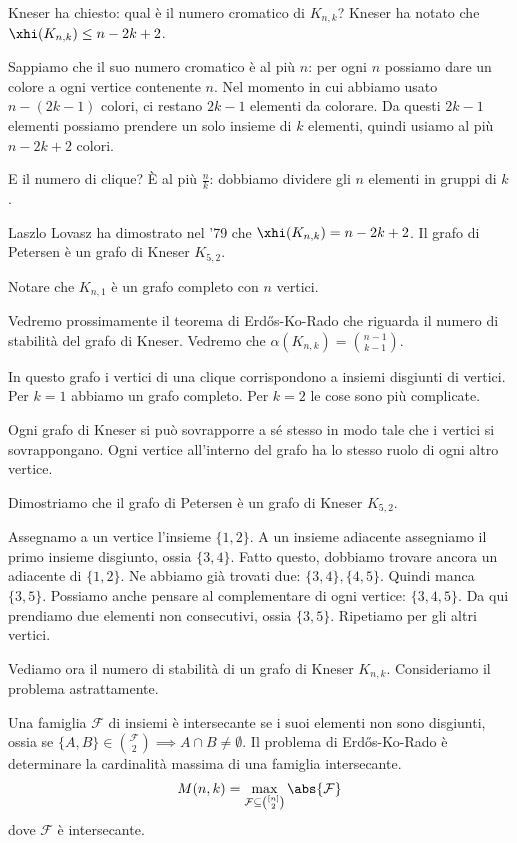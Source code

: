 Kneser ha chiesto: qual \`e il numero cromatico di $K_{n,k}$?
Kneser ha notato che $\xhi(K_{n,k}) \le n - 2k + 2$.

Sappiamo che il suo numero cromatico \`e al pi\`u $n$: per ogni $n$ possiamo dare un colore a ogni vertice contenente $n$.
Nel momento in cui abbiamo usato $n - (2k - 1)$ colori, ci restano $2k -1$ elementi da colorare.
Da questi $2k -1$ elementi possiamo prendere un solo insieme di $k$ elementi, quindi usiamo al pi\`u $n - 2k +2$ colori.

E il numero di clique?
\`E al pi\`u $\frac{n}{k}$: dobbiamo dividere gli $n$ elementi in gruppi di $k$.

Laszlo Lovasz ha dimostrato nel '79 che $\xhi(K_{n,k}) = n - 2k +2$.
Il grafo di Petersen \`e un grafo di Kneser $K_{5,2}$.

Notare che $K_{n,1}$ \`e un grafo completo con $n$ vertici.

Vedremo prossimamente il teorema di Erd\H{o}s-Ko-Rado che riguarda il numero di stabilit\`a del grafo di Kneser.
Vedremo che $\alpha (K_{n,k}) = \binom{n-1}{k-1}$.

In questo grafo i vertici di una clique corrispondono a insiemi disgiunti di vertici.
Per $k = 1$ abbiamo un grafo completo.
Per $k = 2$ le cose sono pi\`u complicate.

Ogni grafo di Kneser si pu\`o sovrapporre a s\'e stesso in modo tale che i vertici si sovrappongano.
Ogni vertice all'interno del grafo ha lo stesso ruolo di ogni altro vertice.

Dimostriamo che il grafo di Petersen \`e un grafo di Kneser $K_{5,2}$.

Assegnamo a un vertice l'insieme $\{1,2\}$.
A un insieme adiacente assegniamo il primo insieme disgiunto, ossia $\{3,4\}$.
Fatto questo, dobbiamo trovare ancora un adiacente di $\{1,2\}$.
Ne abbiamo gi\`a trovati due: $\{3,4\}, \{4,5\}$.
Quindi manca $\{3,5\}$.
Possiamo anche pensare al complementare di ogni vertice: $\{3,4,5\}$.
Da qui prendiamo due elementi non consecutivi, ossia $\{3,5\}$.
Ripetiamo per gli altri vertici.


Vediamo ora il numero di stabilit\`a di un grafo di Kneser $K_{n,k}$.
Consideriamo il problema astrattamente.

Una famiglia $\mathcal{F}$ di insiemi \`e intersecante se i suoi elementi non sono disgiunti, ossia se $\{A,B\} \in \binom{\mathcal{F}}{2} \implies A \cap B \neq \emptyset$.
Il problema di Erd\H{o}s-Ko-Rado \`e determinare la cardinalit\`a massima di una famiglia intersecante.
\[
	M(n,k) = \max\limits_{\mathcal{F}\subseteq\binom{[n]}{2}} \abs{\mathcal{F}}
\]
dove $\mathcal{F}$ \`e intersecante.

